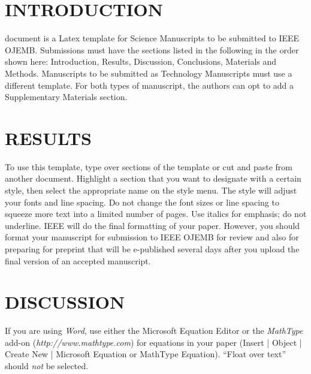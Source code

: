 \documentclass[journal]{IEEEtran}
\begin{document}



%
\IEEEpeerreviewmaketitle

\section{INTRODUCTION}

  document is a Latex template for Science Manuscripts to be submitted to IEEE OJEMB. Submissions must have the sections listed in the following in the order shown here: Introduction, Results, Discussion, Conclusions, Materials and Methods. Manuscripts to be submitted as Technology Manuscripts must use a different template. For both types of manuscript, the authors can opt to add a Supplementary Materials section.

\section{RESULTS}
To use this template, type over sections of the template or cut and paste from another document. Highlight a section that you want to designate with a certain style, then select the appropriate name on the style menu. The style will adjust your fonts and line spacing. Do not change the font sizes or line spacing to squeeze more text into a limited number of pages. Use italics for emphasis; do not underline.
IEEE will do the final formatting of your paper. However, you should format your manuscript for submission to IEEE OJEMB for review and also for preparing for preprint that will be e-published several days after you upload the final version of an accepted manuscript. 

\section{DISCUSSION}
If you are using \textit{Word}, use either the Microsoft Equation Editor or the \textit{MathType} add-on (\textit{http://www.mathtype.com}) for equations in your paper (Insert | Object | Create New | Microsoft Equation or MathType Equation). “Float over text” should \textit{not} be selected. 	
\end{document}
